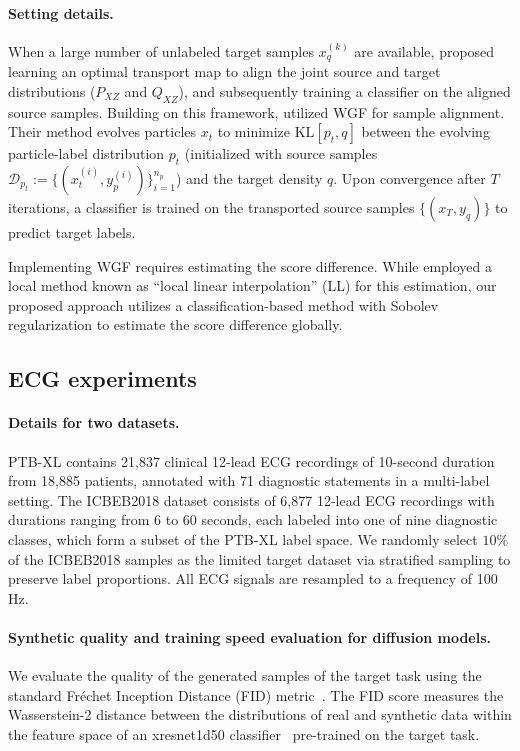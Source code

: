 \documentclass[11pt]{article}
\theoremstyle{plain}
\theoremstyle{definition}
\theoremstyle{remark}
\begin{document}
\paragraph{Setting details.}
When a large number of unlabeled target samples $x_q^{(k)}$ are available, \cite{courty2016optimal} proposed learning an optimal transport map to align the joint source and target distributions ($P_{XZ}$ and $Q_{XZ}$), and subsequently training a classifier on the aligned source samples. Building on this framework, \cite{liu2023minimizing} utilized WGF for sample alignment. Their method evolves particles $x_t$ to minimize $\text{KL}[p_t, q]$ between the evolving particle-label distribution $p_t$ (initialized with source samples $\mathcal{D}_{p_t}:=\{(x_t^{(i)}, y_p^{(i)})\}_{i=1}^{n_p}$) and the target density $q$. Upon convergence after $T$ iterations, a classifier is trained on the transported source samples $\{(x_T, y_q)\}$ to predict target labels.

Implementing WGF requires estimating the score difference. While \cite{liu2023minimizing} employed a local method known as ``local linear interpolation'' (LL) for this estimation, our proposed approach utilizes a classification-based method with Sobolev regularization to estimate the score difference globally.

\subsection{ECG experiments}
\label{subsec: ecg results detail}
\paragraph{Details for two datasets.}
PTB-XL contains 21,837 clinical 12-lead ECG recordings of 10-second duration from 18,885 patients, annotated with 71 diagnostic statements in a multi-label setting. The ICBEB2018 dataset consists of 6,877 12-lead ECG recordings with durations ranging from 6 to 60 seconds, each labeled into one of nine diagnostic classes, which form a subset of the PTB-XL label space. We randomly select $10\%$ of the ICBEB2018 samples as the limited target dataset via stratified sampling to preserve label proportions. All ECG signals are resampled to a frequency of 100 Hz.
\paragraph{Synthetic quality and training speed evaluation for diffusion models.}
We evaluate the quality of the generated samples of the target task using the standard Fréchet Inception Distance (FID) metric~\cite{heusel2017gans}. The FID score measures the Wasserstein-2 distance between the distributions of real and synthetic data within the feature space of an xresnet1d50 classifier~\cite{strodthoff2020deep} pre-trained on the target task.
\end{document}
